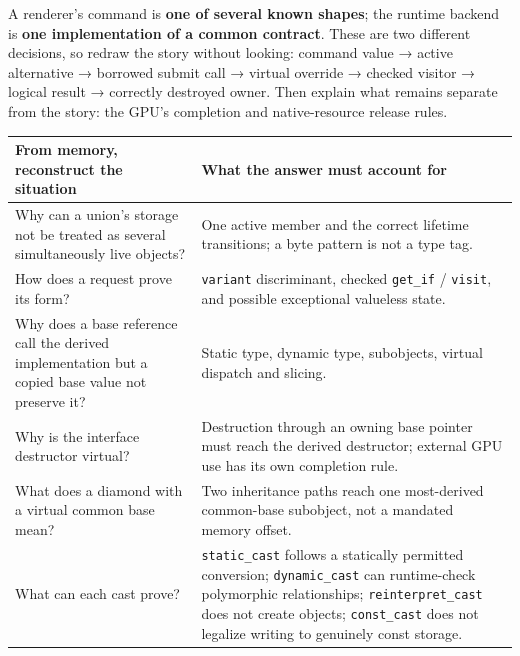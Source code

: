 A renderer's command is \textbf{one of several known shapes}; the runtime backend is \textbf{one implementation of a common contract}. These are two different decisions, so redraw the story without looking: command value → active alternative → borrowed submit call → virtual override → checked visitor → logical result → correctly destroyed owner. Then explain what remains separate from the story: the GPU's completion and native-resource release rules.

{\def\LTcaptype{none} %
\begin{longtable}[]{@{}
  >{\raggedright\arraybackslash}p{}
  >{\raggedright\arraybackslash}p{}@{}}
\toprule\noalign{}
\begin{minipage}[b]{\linewidth}\raggedright
From memory, reconstruct the situation
\end{minipage} & \begin{minipage}[b]{\linewidth}\raggedright
What the answer must account for
\end{minipage} \\
\midrule\noalign{}
\endhead
\bottomrule\noalign{}
\endlastfoot
Why can a union's storage not be treated as several simultaneously live objects? & One active member and the correct lifetime transitions; a byte pattern is not a type tag. \\
How does a request prove its form? & \texttt{variant} discriminant, checked \texttt{get\_if} / \texttt{visit}, and possible exceptional valueless state. \\
Why does a base reference call the derived implementation but a copied base value not preserve it? & Static type, dynamic type, subobjects, virtual dispatch and slicing. \\
Why is the interface destructor virtual? & Destruction through an owning base pointer must reach the derived destructor; external GPU use has its own completion rule. \\
What does a diamond with a virtual common base mean? & Two inheritance paths reach one most-derived common-base subobject, not a mandated memory offset. \\
What can each cast prove? & \texttt{static\_cast} follows a statically permitted conversion; \texttt{dynamic\_cast} can runtime-check polymorphic relationships; \texttt{reinterpret\_cast} does not create objects; \texttt{const\_cast} does not legalize writing to genuinely const storage. \\

\end{longtable}}
